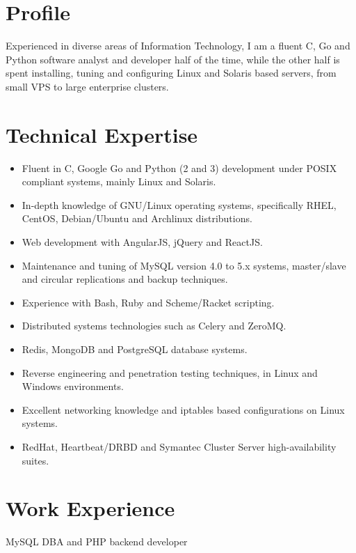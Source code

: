 \documentclass{resume}
\begin{document}

\section{Profile}
Experienced in diverse areas of Information Technology, I am a fluent C, Go and Python software analyst and developer half of the time, while the other half is spent installing, tuning and configuring Linux and Solaris based servers, from small VPS to large enterprise clusters.

\section{Technical Expertise}

\begin{itemize}
  \item Fluent in C, Google Go and Python (2 and 3) development under POSIX compliant systems, mainly Linux and Solaris.
  \item In-depth knowledge of GNU/Linux operating systems, specifically RHEL, CentOS, Debian/Ubuntu and Archlinux distributions.
  \item Web development with AngularJS, jQuery and ReactJS.
  \item Maintenance and tuning of MySQL version 4.0 to 5.x systems, master/slave and circular replications and backup techniques.
  \item Experience with Bash, Ruby and Scheme/Racket scripting.
  \item Distributed systems technologies such as Celery and ZeroMQ.
  \item Redis, MongoDB and PostgreSQL database systems.
  \item Reverse engineering and penetration testing techniques, in Linux and Windows environments.
  \item Excellent networking knowledge and iptables based configurations on Linux systems.
  \item RedHat, Heartbeat/DRBD and Symantec Cluster Server high-availability suites.
\end{itemize}

\section{Work Experience}

MySQL DBA and PHP backend developer
\end{document}
